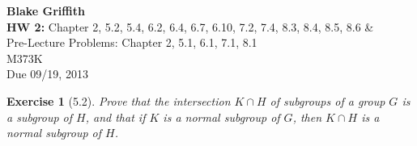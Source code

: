 \documentclass[12pt,leqno]{article}
\numberwithin{equation}{section}
\newtheorem*{exer}{Exercise}
\theoremstyle{definition}
\begin{document}
\thispagestyle{plain}
\begin{flushright}
\large{\textbf{Blake Griffith \\}
\textbf{HW 2:} Chapter 2, 5.2, 5.4, 6.2, 6.4, 6.7, 6.10, 7.2, 7.4, 8.3, 8.4, 8.5, 8.6  \& \\
Pre-Lecture Problems: Chapter 2, 5.1, 6.1, 7.1, 8.1\\
M373K \\
Due 09/19, 2013 \\}
\end{flushright}

\markboth{}{} \setcounter{section}{0} \baselineskip=18pt

\setcounter{tocdepth}{4}


\begin{exer}[5.2]
Prove that the intersection $K \cap H $ of subgroups of a group $G$ is a
subgroup of $H$, and that if $K$ is a normal subgroup of $G$, then $K \cap H$
is a normal subgroup of $H$.  
\end{exer}
\end{document}
